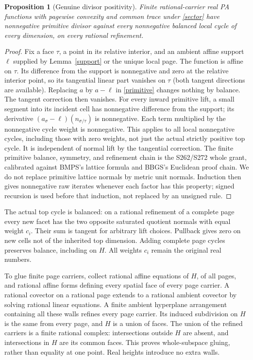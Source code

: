 \documentclass[11pt]{article}
\newtheorem{proposition}[theorem]{Proposition}
\theoremstyle{definition}\newtheorem{definition}[theorem]{Definition}
\theoremstyle{remark}\newtheorem{remark}[theorem]{Remark}
\begin{document}
\begin{proposition}[Genuine divisor positivity]\label{positive}
Finite rational-carrier real PA functions with pagewise convexity and common trace under \eqref{sector} have nonnegative primitive divisor against every nonnegative balanced local cycle of every dimension, on every rational refinement.
\end{proposition}
\begin{proof}
Fix a face $\tau$, a point in its relative interior, and an ambient affine support $\ell$ supplied by Lemma~\ref{support} or the unique local page. The function is affine on $\tau$. Its difference from the support is nonnegative and zero at the relative interior point, so its tangential linear part vanishes on $\tau$ (both tangent directions are available). Replacing $a$ by $a-\ell$ in \eqref{primitive} changes nothing by balance. The tangent correction then vanishes. For every inward primitive lift, a small segment into its incident cell has nonnegative difference from the support; its derivative $(a_\sigma-\ell)(n_{\sigma/\tau})$ is nonnegative. Each term multiplied by the nonnegative cycle weight is nonnegative. This applies to all local nonnegative cycles, including those with zero weights, not just the actual strictly positive top cycle. It is independent of normal lift by the tangential correction. The finite primitive balance, symmetry, and refinement chain is the S262/S272 whole grant, calibrated against BMPS's lattice formula and BBGS's Euclidean proof chain. We do not replace primitive lattice normals by metric unit normals. Induction then gives nonnegative raw iterates whenever each factor has this property; signed recursion is used before that induction, not replaced by an unsigned rule.
\end{proof}

The actual top cycle is balanced: on a rational refinement of a complete page every new facet has the two opposite saturated quotient normals with equal weight $c_i$. Their sum is tangent for arbitrary lift choices. Pullback gives zero on new cells not of the inherited top dimension. Adding complete page cycles preserves balance, including on $H$. All weights $c_i$ remain the original real numbers.

To glue finite page carriers, collect rational affine equations of $H$, of all pages, and rational affine forms defining every spatial face of every page carrier. A rational covector on a rational page extends to a rational ambient covector by solving rational linear equations. A finite ambient hyperplane arrangement containing all these walls refines every page carrier. Its induced subdivision on $H$ is the same from every page, and $H$ is a union of faces. The union of the refined carriers is a finite rational complex: intersections outside $H$ are absent, and intersections in $H$ are its common faces. This proves whole-subspace gluing, rather than equality at one point. Real heights introduce no extra walls.
\end{document}

